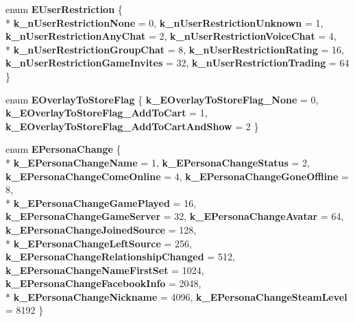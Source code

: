 \begin{DoxyCompactItemize}
\item 
\hypertarget{namespaceValve_1_1Steamworks_a41e12e1765dc7219ace9c49baa95022e}{}enum {\bfseries E\+User\+Restriction} \{ \\*
{\bfseries k\+\_\+n\+User\+Restriction\+None} = 0, 
{\bfseries k\+\_\+n\+User\+Restriction\+Unknown} = 1, 
{\bfseries k\+\_\+n\+User\+Restriction\+Any\+Chat} = 2, 
{\bfseries k\+\_\+n\+User\+Restriction\+Voice\+Chat} = 4, 
\\*
{\bfseries k\+\_\+n\+User\+Restriction\+Group\+Chat} = 8, 
{\bfseries k\+\_\+n\+User\+Restriction\+Rating} = 16, 
{\bfseries k\+\_\+n\+User\+Restriction\+Game\+Invites} = 32, 
{\bfseries k\+\_\+n\+User\+Restriction\+Trading} = 64
 \}\label{namespaceValve_1_1Steamworks_a41e12e1765dc7219ace9c49baa95022e}

\item 
\hypertarget{namespaceValve_1_1Steamworks_a7a0247717abf607692b67c164630d8b7}{}enum {\bfseries E\+Overlay\+To\+Store\+Flag} \{ {\bfseries k\+\_\+\+E\+Overlay\+To\+Store\+Flag\+\_\+\+None} = 0, 
{\bfseries k\+\_\+\+E\+Overlay\+To\+Store\+Flag\+\_\+\+Add\+To\+Cart} = 1, 
{\bfseries k\+\_\+\+E\+Overlay\+To\+Store\+Flag\+\_\+\+Add\+To\+Cart\+And\+Show} = 2
 \}\label{namespaceValve_1_1Steamworks_a7a0247717abf607692b67c164630d8b7}

\item 
\hypertarget{namespaceValve_1_1Steamworks_aac0b561dfd8e841c0f6f17ec1222461f}{}enum {\bfseries E\+Persona\+Change} \{ \\*
{\bfseries k\+\_\+\+E\+Persona\+Change\+Name} = 1, 
{\bfseries k\+\_\+\+E\+Persona\+Change\+Status} = 2, 
{\bfseries k\+\_\+\+E\+Persona\+Change\+Come\+Online} = 4, 
{\bfseries k\+\_\+\+E\+Persona\+Change\+Gone\+Offline} = 8, 
\\*
{\bfseries k\+\_\+\+E\+Persona\+Change\+Game\+Played} = 16, 
{\bfseries k\+\_\+\+E\+Persona\+Change\+Game\+Server} = 32, 
{\bfseries k\+\_\+\+E\+Persona\+Change\+Avatar} = 64, 
{\bfseries k\+\_\+\+E\+Persona\+Change\+Joined\+Source} = 128, 
\\*
{\bfseries k\+\_\+\+E\+Persona\+Change\+Left\+Source} = 256, 
{\bfseries k\+\_\+\+E\+Persona\+Change\+Relationship\+Changed} = 512, 
{\bfseries k\+\_\+\+E\+Persona\+Change\+Name\+First\+Set} = 1024, 
{\bfseries k\+\_\+\+E\+Persona\+Change\+Facebook\+Info} = 2048, 
\\*
{\bfseries k\+\_\+\+E\+Persona\+Change\+Nickname} = 4096, 
{\bfseries k\+\_\+\+E\+Persona\+Change\+Steam\+Level} = 8192
 \}\label{namespaceValve_1_1Steamworks_aac0b561dfd8e841c0f6f17ec1222461f}


\end{DoxyCompactItemize}
